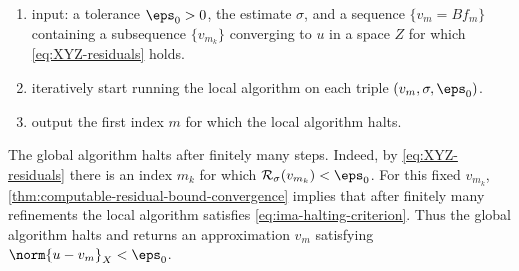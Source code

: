 \begin{enumerate}
    \item input: a tolerance $\eps_0>0$, the estimate $\sigma$, and a sequence
    $\{v_m=Bf_m\}$ containing a subsequence $\{v_{m_k}\}$ converging to $u$
    in a space $Z$ for which
    \eqref{eq:XYZ-residuals} holds.
    \item iteratively start running the local algorithm on each triple
    $(v_m,\sigma,\eps_0)$.
    \item output the first index $m$ for which the local algorithm halts.
\end{enumerate}

The global algorithm halts after finitely many steps. Indeed, by \eqref{eq:XYZ-residuals} there is an index $m_k$ for which
$\mathcal R_\sigma(v_{m_k})<\eps_0$.  For this fixed $v_{m_k}$,
\cref{thm:computable-residual-bound-convergence} implies that after finitely
many refinements the local algorithm satisfies
\eqref{eq:ima-halting-criterion}. Thus the global algorithm halts and returns
an approximation $v_m$ satisfying $\norm{u-v_m}_X<\eps_0$.
